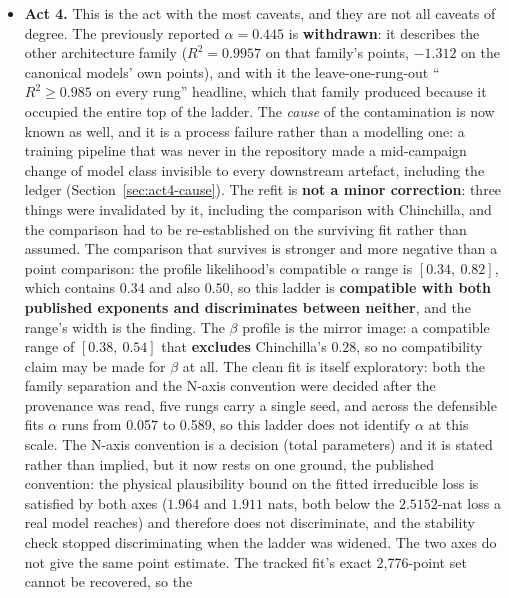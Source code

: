 \documentclass[11pt,a4paper]{article}
\begin{document}
\begin{itemize}
\item \textbf{Act 4.} This is the act with the most caveats, and they are
      not all caveats of degree. The previously reported $\alpha = 0.445$ is
      \textbf{withdrawn}: it describes the other architecture family
      ($R^2 = 0.9957$ on that family's points, $-1.312$ on the canonical
      models' own points), and with it the leave-one-rung-out ``$R^2 \geq
      0.985$ on every rung'' headline, which that family produced because it
      occupied the entire top of the ladder. The \emph{cause} of the
      contamination is now known as well, and it is a process failure rather
      than a modelling one: a training pipeline that was never in the
      repository made a mid-campaign change of model class invisible to every
      downstream artefact, including the ledger
      (Section~\ref{sec:act4-cause}). The refit is \textbf{not a minor
      correction}: three things were invalidated by it, including the
      comparison with Chinchilla, and the comparison had to be re-established
      on the surviving fit rather than assumed. The comparison that survives
      is stronger and more negative than a point comparison: the profile
      likelihood's compatible $\alpha$ range is $[0.34,\ 0.82]$, which
      contains $0.34$ and also $0.50$, so this ladder is \textbf{compatible
      with both published exponents and discriminates between neither}, and
      the range's width is the finding. The
      $\beta$ profile is the mirror image: a compatible range of
      $[0.38,\ 0.54]$ that \textbf{excludes} Chinchilla's $0.28$, so no
      compatibility claim may be made for $\beta$ at all. The clean fit is
      itself exploratory: both the family separation and the N-axis
      convention were decided after the provenance was read, five rungs carry a
      single seed, and across the defensible fits $\alpha$ runs from 0.057 to
      0.589, so this ladder does not
      identify $\alpha$ at this scale. The N-axis convention is a decision
      (total parameters) and it is stated rather than implied, but it now rests
      on one ground, the published convention: the physical plausibility bound
      on the fitted irreducible loss is satisfied by both axes ($1.964$ and
      $1.911$ nats, both below the $2.5152$-nat loss a real model reaches) and
      therefore does not discriminate, and the stability check stopped
      discriminating when the ladder was widened. The two axes do not give the
      same point estimate.
      The tracked fit's exact 2,776-point set cannot be recovered, so the

\end{itemize}
\end{document}
